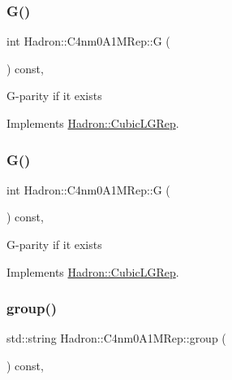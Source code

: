 \subsubsection{\texorpdfstring{G()}{G()}\hspace{0.1cm}{\footnotesize\ttfamily [2/3]}}
{\footnotesize\ttfamily int Hadron\+::\+C4nm0\+A1\+M\+Rep\+::G (\begin{DoxyParamCaption}{ }\end{DoxyParamCaption}) const\hspace{0.3cm}{\ttfamily [inline]}, {\ttfamily [virtual]}}

G-\/parity if it exists 

Implements \mbox{\hyperlink{structHadron_1_1CubicLGRep_ace26f7b2d55e3a668a14cb9026da5231}{Hadron\+::\+Cubic\+L\+G\+Rep}}.

\mbox{\label{structHadron_1_1C4nm0A1MRep_a4b8cedc0bf2a2c77a259d33915be1ab9}} 
\subsubsection{\texorpdfstring{G()}{G()}\hspace{0.1cm}{\footnotesize\ttfamily [3/3]}}
{\footnotesize\ttfamily int Hadron\+::\+C4nm0\+A1\+M\+Rep\+::G (\begin{DoxyParamCaption}{ }\end{DoxyParamCaption}) const\hspace{0.3cm}{\ttfamily [inline]}, {\ttfamily [virtual]}}

G-\/parity if it exists 

Implements \mbox{\hyperlink{structHadron_1_1CubicLGRep_ace26f7b2d55e3a668a14cb9026da5231}{Hadron\+::\+Cubic\+L\+G\+Rep}}.

\mbox{\label{structHadron_1_1C4nm0A1MRep_ab9dfbb74d6f659e9ec0131a37976b77a}} 
\subsubsection{\texorpdfstring{group()}{group()}\hspace{0.1cm}{\footnotesize\ttfamily [1/3]}}
{\footnotesize\ttfamily std\+::string Hadron\+::\+C4nm0\+A1\+M\+Rep\+::group (\begin{DoxyParamCaption}{ }\end{DoxyParamCaption}) const\hspace{0.3cm}{\ttfamily [inline]}, {\ttfamily [virtual]}}

